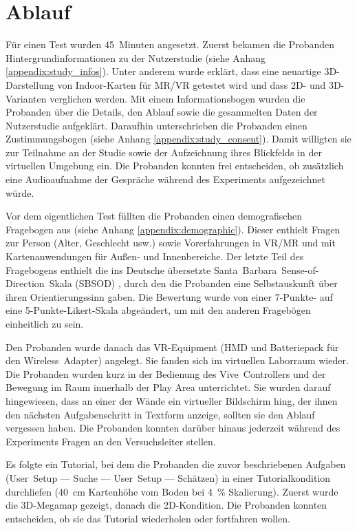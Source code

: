 \section{Ablauf}
Für einen Test wurden \num{45}~Minuten angesetzt.
Zuerst bekamen die Probanden Hintergrundinformationen zu der Nutzerstudie (siehe Anhang \autoref{appendix:study_infos}).
Unter anderem wurde erklärt, dass eine neuartige 3D-Darstellung von Indoor-Karten für MR/VR getestet wird und dass 2D- und 3D-Varianten verglichen werden.
Mit einem Informationsbogen wurden die Probanden über die Details, den Ablauf sowie die gesammelten Daten der Nutzerstudie aufgeklärt.
Daraufhin unterschrieben die Probanden einen Zustimmungsbogen (siehe Anhang \autoref{appendix:study_consent}).
Damit willigten sie zur Teilnahme an der Studie sowie der Aufzeichnung ihres Blickfelds in der virtuellen Umgebung ein.
Die Probanden konnten frei entscheiden, ob zusätzlich eine Audioaufnahme der Gespräche während des Experiments aufgezeichnet würde.
 
Vor dem eigentlichen Test füllten die Probanden einen demografischen Fragebogen aus (siehe Anhang \autoref{appendix:demographic}).
Dieser enthielt Fragen zur Person (Alter, Geschlecht usw.) sowie Vorerfahrungen in VR/MR und mit Kartenanwendungen für Außen- und Innenbereiche. Der letzte Teil des Fragebogens enthielt die ins Deutsche übersetzte Santa~Barbara~Sense-of-Direction~Skala (SBSOD) \parencite{Hegarty2002}, durch den die Probanden eine Selbstauskunft über ihren Orientierungssinn gaben.
Die Bewertung wurde von einer 7-Punkte- auf eine 5-Punkte-Likert-Skala abgeändert, um mit den anderen Fragebögen einheitlich zu sein.

Den Probanden wurde danach das VR-Equipment (HMD und Batteriepack für den Wireless~Adapter) angelegt.
Sie fanden sich im virtuellen Laborraum wieder.
Die Probanden wurden kurz in der Bedienung des Vive~Controllers und der Bewegung im Raum innerhalb der Play Area unterrichtet.
Sie wurden darauf hingewiesen, dass an einer der Wände ein virtueller Bildschirm hing, der ihnen den nächsten Aufgabenschritt in Textform anzeige, sollten sie den Ablauf vergessen haben.
Die Probanden konnten darüber hinaus jederzeit während des Experiments Fragen an den Versuchsleiter stellen.

Es folgte ein Tutorial, bei dem die Probanden die zuvor beschriebenen Aufgaben (User~Setup --- Suche --- User~Setup --- Schätzen) in einer Tutorialkondition durchliefen (\SI{40}{\cm} Kartenhöhe vom Boden bei \SI{4}{\percent} Skalierung).
Zuerst wurde die 3D-Megamap gezeigt, danach die 2D-Kondition.
Die Probanden konnten entscheiden, ob sie das Tutorial wiederholen oder fortfahren wollen.

